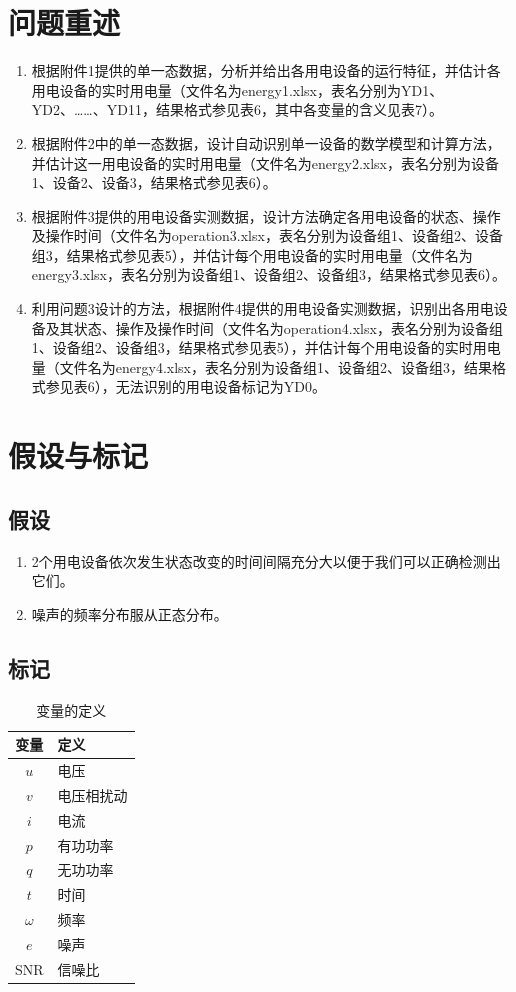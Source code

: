 \documentclass[UTF8]{article}
\begin{document}
\section{问题重述}
\begin{enumerate}[1]
\item 根据附件1提供的单一态数据，分析并给出各用电设备的运行特征，并估计各用电设备的实时用电量（文件名为energy1.xlsx，表名分别为YD1、YD2、……、YD11，结果格式参见表6，其中各变量的含义见表7）。
\item 根据附件2中的单一态数据，设计自动识别单一设备的数学模型和计算方法，并估计这一用电设备的实时用电量（文件名为energy2.xlsx，表名分别为设备1、设备2、设备3，结果格式参见表6）。
\item 根据附件3提供的用电设备实测数据，设计方法确定各用电设备的状态、操作及操作时间（文件名为operation3.xlsx，表名分别为设备组1、设备组2、设备组3，结果格式参见表5），并估计每个用电设备的实时用电量（文件名为energy3.xlsx，表名分别为设备组1、设备组2、设备组3，结果格式参见表6）。
\item 利用问题3设计的方法，根据附件4提供的用电设备实测数据，识别出各用电设备及其状态、操作及操作时间（文件名为operation4.xlsx，表名分别为设备组1、设备组2、设备组3，结果格式参见表5），并估计每个用电设备的实时用电量（文件名为energy4.xlsx，表名分别为设备组1、设备组2、设备组3，结果格式参见表6），无法识别的用电设备标记为YD0。
\end{enumerate}

\section{假设与标记}
\subsection{假设}
\begin{enumerate}[1]
\item 2个用电设备依次发生状态改变的时间间隔充分大以便于我们可以正确检测出它们。
\item 噪声的频率分布服从正态分布。
\end{enumerate}

\subsection{标记}
\begin{table}[htbp]
\centering
\caption{变量的定义}
\begin{tabular}{|c|l|}
\hline
变量&定义\\
\hline
\(u\)&电压\\
\hline
\(v\)&电压相扰动\\
\hline
\(i\)&电流\\
\hline
\(p\)&有功功率\\
\hline
\(q\)&无功功率\\
\hline
\(t\)&时间\\
\hline
\(\omega\)&频率\\
\hline
\(e\)&噪声\\
\hline
SNR&信噪比\\
\hline
\end{tabular}
\end{table}
\end{document}
